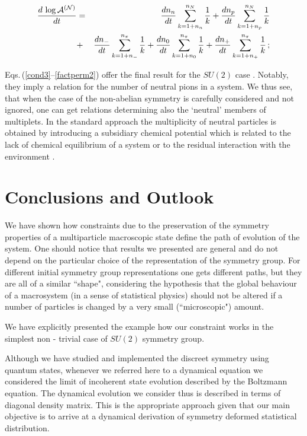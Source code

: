 \documentclass[a4paper,11pt]{article}
\begin{document}
\begin{eqnarray}\label{factperm2}
\frac{d\,\log{\cal A}^{({\cal N})}}{dt}
&=&\frac{dn_n}{dt}\sum^{n_N}_{k=1+n_n}{1\over k}
+\frac{dn_p}{dt}\sum^{n_N}_{k=1+n_p}{1\over k}\nonumber\\
&+&\frac{dn_{-}}{dt}\sum^{n_\pi}_{k=1+n_{-}}{1\over k}+
\frac{dn_0}{dt}\sum^{n_\pi}_{k=1+n_0}{1\over k}
+\frac{dn_{+}}{dt}\sum^{n_\pi}_{k=1+n_{+}}{1\over k}\,;
\end{eqnarray}

Eqs.\,(\ref{cond3}--\ref{factperm2}) offer the final result for
the $SU(2)$ case . Notably, they imply a  relation for the number
of neutral pions in a system. We thus see, that when the case of
the non-abelian symmetry is carefully considered and not ignored,
one can get relations determining also the `neutral' members of
multiplets. In the standard approach the multiplicity of neutral
particles is obtained by introducing a subsidiary chemical
potential which is related to the lack of chemical equilibrium of
a system \cite{Kataja} or to the residual interaction with the
environment \cite{Turko2}.

\section{\normalsize\bf Conclusions and Outlook}\label{conc}
\noindent
 We have shown how constraints due to the preservation of the
symmetry properties of a multiparticle macroscopic state define
the path of evolution of the system. One should notice that
results we presented are general and do not depend on the
particular choice of the representation of the symmetry group. For
different initial symmetry group representations one gets
different paths, but they are all of a similar ``shape",
considering the hypothesis that the global behaviour of a
macrosystem (in a sense of statistical physics) should not be
altered  if a number of particles is changed by a very small
(``microscopic") amount.

We have explicitly presented the example how our constraint works
in the simplest non - trivial case of $SU(2)$ symmetry group.

Although we have studied and implemented the discreet symmetry
using quantum states, whenever we referred here to a dynamical
equation we considered the limit of incoherent state evolution
described by the Boltzmann equation. The dynamical evolution we
consider thus is described in terms of diagonal density matrix.
This is the appropriate approach given that our main objective is
to arrive at a dynamical derivation of symmetry deformed
statistical distribution.
\end{document}
